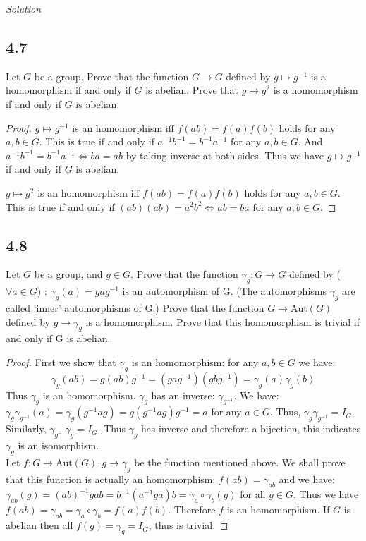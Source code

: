 \documentclass[a4paper, pdf, 12pt]{article}
\begin{document}
\noindent
\textit{Solution}\quad

\subsection*{4.7}
Let $G$ be a group. Prove that the function $G \rightarrow G$ defined by $g \mapsto g^{-1}$ is a
homomorphism if and only if $G$ is abelian. Prove that $g \mapsto g^2$ is a homomorphism
if and only if $G$ is abelian.
\begin{proof}
  $g\mapsto g^{-1}$ is an homomorphism iff $f(ab)=f(a)f(b)$ holds for any $a,b\in G$.
  This is true if and only if $a^{-1}b^{-1}=b^{-1}a^{-1}$ for any $a,b\in G$. And
  $a^{-1}b^{-1}=b^{-1}a^{-1}\Longleftrightarrow ba=ab$ by taking inverse at both sides. Thus we
  have $g\mapsto g^{-1}$ if and only if $G$ is abelian.

  $g\mapsto g^{2}$ is an homomorphism iff $f(ab) = f(a)f(b)$ holds for any $a,b\in G$.
  This is true if and only if $(ab)(ab) = a^2b^2\Longleftrightarrow ab=ba$ for any $a,b\in G$.
\end{proof}

\subsection*{4.8}
Let $G$ be a group, and $g \in G$. Prove that the function
$\gamma_{g} : G \rightarrow G$ defined
by ($\forall a\in G$) : $\gamma_{g}(a) = gag^{-1}$ is an automorphism of G.
(The automorphisms $\gamma_{g}$ are
called ‘inner’ automorphisms of G.) Prove that the function $G \rightarrow \mbox{Aut}(G)$ defined
by $g \rightarrow \gamma_{g}$ is a homomorphism. Prove that this homomorphism is trivial if and
only if G is abelian.

\begin{proof}
  First we show that $\gamma_{g}$ is an homomorphism: for any $a,b\in G$ we have:
  $$
    \gamma_{g}(ab) = g(ab)g^{-1} = (gag^{-1})(gbg^{-1}) = \gamma_{g}(a)\gamma_{g}(b)
  $$
  Thus $\gamma_{g}$ is an homomorphism. $\gamma_{g}$ has an inverse: $\gamma_{g^{-1}}$.
  We have:$\gamma_{g}\gamma_{g^{-1}}(a) = \gamma_{g}(g^{-1}ag)=g(g^{-1}ag)g^{-1} = a$ for
  any $a\in G$. Thus, $\gamma_{g}\gamma_{g^{-1}}=I_{G}$. Similarly, $\gamma_{g^{-1}}\gamma_{g}=I_{G}$.
  Thus $\gamma_{g}$ has inverse and therefore a bijection, this indicates $\gamma_{g}$ is an isomorphism.\\

  Let $f: G\rightarrow \mbox{Aut}(G), g\rightarrow \gamma_{g}$ be the function mentioned above. We shall prove that this
  function is actually an homomorphism:
  $f(ab) = \gamma_{ab}$ and we have:$\gamma_{ab}(g) = (ab)^{-1}gab = b^{-1}(a^{-1}ga)b = \gamma_{a}\circ\gamma_{b}(g)$ for all
  $g\in G$. Thus we have $f(ab) = \gamma_{ab}=\gamma_{a}\circ\gamma_{b}=f(a)f(b)$. Therefore $f$ is an homomorphism.
  If $G$ is abelian then all $f(g) = \gamma_{g}=I_{G}$, thus is trivial.
\end{proof}
\end{document}
